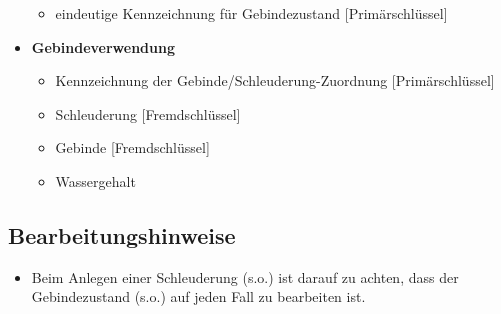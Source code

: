 \begin{itemize}
\begin{itemize}
    \item eindeutige Kennzeichnung für Gebindezustand [Primärschlüssel]
  \end{itemize}
\item \textbf{Gebindeverwendung}\label{DBgebv}  \begin{itemize}
\item Kennzeichnung der Gebinde/Schleuderung-Zuordnung [Primärschlüssel]    \item Schleuderung [Fremdschlüssel]
    \item Gebinde [Fremdschlüssel]
    \item Wassergehalt
  \end{itemize}
\end{itemize}
\subsection{Bearbeitungshinweise}

\begin{itemize}
\item Beim Anlegen einer Schleuderung (s.o.) ist darauf zu achten, dass
der Gebindezustand (s.o.) auf jeden Fall zu bearbeiten ist.
\end{itemize}